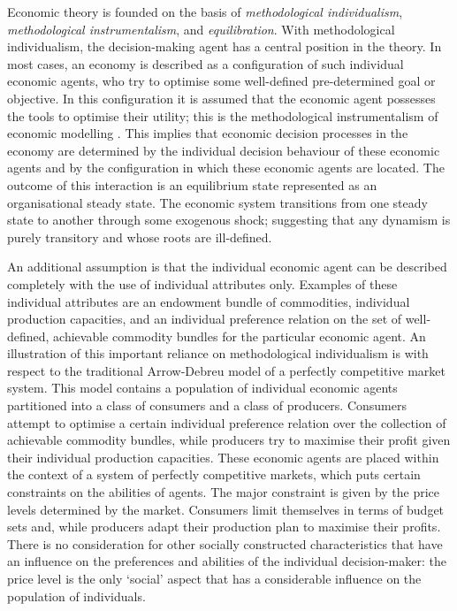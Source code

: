Economic theory is founded on the basis of \emph{methodological individualism}, \emph{methodological instrumentalism}, and \emph{equilibration}. With methodological individualism, the decision-making agent has a central position in the theory. In most cases, an economy is described as a configuration of such individual economic agents, who try to optimise some well-defined pre-determined goal or objective. In this configuration it is assumed that the economic agent possesses the tools to optimise their utility; this is the methodological instrumentalism of economic modelling \citep{Arnsperger2006}. This implies that economic decision processes in the economy are determined by the individual decision behaviour of these economic agents and by the configuration in which these economic agents are located. The outcome of this interaction is an equilibrium state represented as an organisational steady state. The economic system transitions from one steady state to another through some exogenous shock; suggesting that any dynamism is purely transitory and whose roots are ill-defined.

An additional assumption is that the individual economic agent can be described completely with the use of individual attributes only. Examples of these individual attributes are an endowment bundle of commodities, individual production capacities, and an individual preference relation on the set of well-defined, achievable commodity bundles for the particular economic agent. An illustration of this important reliance on methodological individualism is with respect to the traditional Arrow-Debreu model of a perfectly competitive market system. This model contains a population of individual economic agents partitioned into a class of consumers and a class of producers. Consumers attempt to optimise a certain individual preference relation over the collection of achievable commodity bundles, while producers try to maximise their profit given their individual production capacities. These economic agents are placed within the context of a system of perfectly competitive markets, which puts certain constraints on the abilities of agents. The major constraint is given by the price levels determined by the market. Consumers limit themselves in terms of budget sets and, while producers adapt their production plan to maximise their profits. There is no consideration for other socially constructed characteristics that have an influence on the preferences and abilities of the individual decision-maker: the price level is the only `social' aspect that has a considerable influence on the population of individuals.

